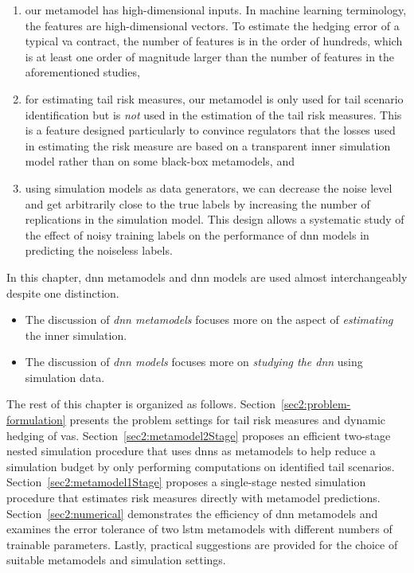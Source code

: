 \begin{enumerate}
    \item  our metamodel has high-dimensional inputs. In machine learning terminology, the features are high-dimensional vectors.
    To estimate the hedging error of a typical \gls{va} contract, the number of features is in the order of hundreds, which is at least one order of magnitude larger than the number of features in the aforementioned studies,
    \item  for estimating tail risk measures, our metamodel is only used for tail scenario identification but is \textit{not} used in the estimation of the tail risk measures.
    This is a feature designed particularly to convince regulators that the losses used in estimating the risk measure are based on a transparent inner simulation model rather than on some black-box metamodels, and
    \item  using simulation models as data generators, we can decrease the noise level and get arbitrarily close to the true labels by increasing the number of replications in the simulation model.
    This design allows a systematic study of the effect of noisy training labels on the performance of \gls{dnn} models in predicting the noiseless labels.
\end{enumerate}

In this chapter, \gls{dnn} metamodels and \gls{dnn} models are used almost interchangeably despite one distinction.
\begin{itemize}
    \item The discussion of \textit{\gls{dnn} metamodels} focuses more on the aspect of \textit{estimating} the inner simulation.
    \item The discussion of \textit{\gls{dnn} models} focuses more on \textit{studying the \gls{dnn}} using simulation data.
\end{itemize}

The rest of this chapter is organized as follows.
Section~\ref{sec2:problem-formulation} presents the problem settings for tail risk measures and dynamic hedging of \gls{va}s. 
Section~\ref{sec2:metamodel2Stage} proposes an efficient two-stage nested simulation procedure that uses \gls{dnn}s as metamodels to help reduce a simulation budget by only performing computations on identified tail scenarios. 
Section~\ref{sec2:metamodel1Stage} proposes a single-stage nested simulation procedure that estimates risk measures directly with metamodel predictions.
Section~\ref{sec2:numerical} demonstrates the efficiency of \gls{dnn} metamodels and examines the error tolerance of two \gls{lstm} metamodels with different numbers of trainable parameters. 
Lastly, practical suggestions are provided for the choice of suitable metamodels and simulation settings. 

